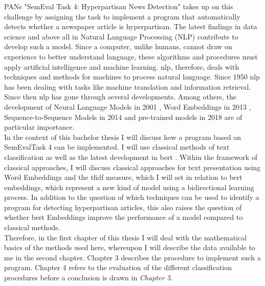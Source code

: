 \documentclass[a4paper, 11pt,titlepage,oneside,openany]{book}
\begin{document}
\indent PANs "SemEval Task 4: Hyperpartisan News Detection" \cite{hyperpartisannewsdetection} takes up on this challenge by assigning the task to implement a program that automatically detects whether a newspaper article is hyperpartisan. The latest findings in data science and above all in Natural Language Processing (NLP) contribute to develop such a model. Since a computer, unlike humans, cannot draw on experience to better understand language, these algorithms and procedures must apply artificial intelligence and machine learning. \gls{nlp}, therefore, deals with techniques and methods for machines to process natural language. Since 1950 \gls{nlp} has been dealing with tasks like machine translation and information retrieval. Since then \gls{nlp} has gone through several developments. Among others, the development of Neural Language Models in 2001 \cite{neural}, Word Embeddings in 2013 \cite{wb1}, Sequence-to-Sequence Models in 2014 \cite{s2s} and pre-trained models in 2018 \cite{pre1}\cite{pre2}\cite{pre3} are of particular importance. \\
\indent In the context of this bachelor thesis I will discuss how a program based on SemEvalTask 4 can be implemented. I will use classical methods of text classification as well as the latest development in \gls{bert} \cite{bert}. Within the framework of classical approaches, I will discuss classical approaches for text presentation using Word Embeddings and the \gls{tfidf}  \cite{infor} measure, which I will set in relation to \gls{bert} embeddings, which represent a new kind of model using a bidirectional learning process. In addition to the question of which techniques can be used to identify a program for detecting hyperpartisan articles, this also raises the question of whether \gls{bert} Embeddings improve the performance of a model compared to classical methods. \\
\indent Therefore, in the first chapter of this thesis I will deal with the mathematical basics of the methods used here, whereupon I will describe the data available to me in the second chapter. Chapter 3 describes the procedure to implement such a program. Chapter 4 refers to the evaluation of the different classification procedures before a conclusion is drawn in \textit{Chapter 5}. 
\end{document}
